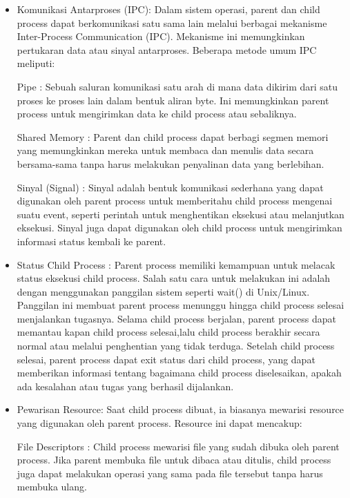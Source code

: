 \documentclass[12pt]{article}
\begin{document}
\begin{itemize}
    \item {Komunikasi Antarproses (IPC):} Dalam sistem operasi, parent dan child process dapat berkomunikasi satu sama lain melalui berbagai mekanisme Inter-Process Communication (IPC). Mekanisme ini memungkinkan pertukaran data atau sinyal antarproses. Beberapa metode umum IPC meliputi:

    
    {Pipe :} Sebuah saluran komunikasi satu arah di mana data dikirim dari satu proses ke proses lain dalam bentuk aliran byte. Ini memungkinkan parent process untuk mengirimkan data ke child process atau sebaliknya.
    
    {Shared Memory :} Parent dan child process dapat berbagi segmen memori yang memungkinkan mereka untuk membaca dan menulis data secara bersama-sama tanpa harus melakukan penyalinan data yang berlebihan.
    
    {Sinyal (Signal) :} Sinyal adalah bentuk komunikasi sederhana yang dapat digunakan oleh parent process untuk memberitahu child process mengenai suatu event, seperti perintah untuk menghentikan eksekusi atau melanjutkan eksekusi. Sinyal juga dapat digunakan oleh child process untuk mengirimkan informasi status kembali ke parent.
    
    \item {Status Child Process :} Parent process memiliki kemampuan untuk melacak status eksekusi child process. Salah satu cara untuk melakukan ini adalah dengan menggunakan panggilan sistem seperti wait() di Unix/Linux. Panggilan ini membuat parent process menunggu hingga child process selesai menjalankan tugasnya. Selama child process berjalan, parent process dapat memantau kapan child process selesai,lalu child process berakhir secara normal atau melalui penghentian yang tidak terduga. Setelah child process selesai, parent process dapat exit status dari child process, yang dapat memberikan informasi tentang bagaimana child process diselesaikan, apakah ada kesalahan atau tugas yang berhasil dijalankan.
    
    \item {Pewarisan Resource:} Saat child process dibuat, ia biasanya mewarisi resource yang digunakan oleh parent process. Resource ini dapat mencakup:

    {File Descriptors :} Child process mewarisi file yang sudah dibuka oleh parent process. Jika parent membuka file untuk dibaca atau ditulis, child process juga dapat melakukan operasi yang sama pada file tersebut tanpa harus membuka ulang.
    

\end{itemize}
\end{document}
